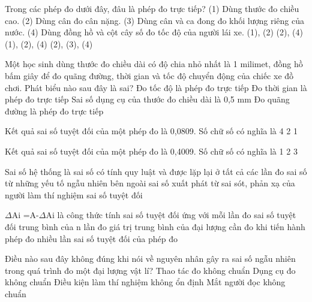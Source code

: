 \begin{ex} Trong các phép đo dưới đây, đâu là phép đo trực tiếp?
(1) Dùng thước đo chiều cao.
(2) Dùng cân đo cân nặng.
(3) Dùng cân và ca đong đo khối lượng riêng của nước.
(4) Dùng đồng hồ và cột cây số đo tốc độ của người lái xe.
\choice
{\True (1), (2)}
{(2), (4)}
{(1), (2), (4)}
{(2), (3), (4)}
\loigiai{}
\end{ex}

\begin{ex} Một học sinh dùng thước đo chiều dài có độ chia nhỏ nhất là 1 milimet, đồng
hồ bấm giây để đo quãng đường, thời gian và tốc độ chuyển động của chiếc xe đồ chơi.
Phát biểu nào sau đây là sai?
\choice
{\True Đo tốc độ là phép đo trực tiếp}
{Đo thời gian là phép đo trực tiếp}
{Sai số dụng cụ của thước đo chiều dài là 0,5 mm}
{Đo quãng đường là phép đo trực tiếp}
\loigiai{}
\end{ex}

\begin{ex} Kết quả sai số tuyệt đối của một phép đo là 0,0809. Số chữ số có nghĩa là
\choice
{4}
{2}
{1}
{}
\end{ex}

\begin{ex} Kết quả sai số tuyệt đối của một phép đo là 0,4009. Số chữ số có nghĩa là
\choice
{}
{1}
{2}
{3}
\end{ex}

\begin{ex} Sai số hệ thống là
\choice
{\True sai số có tính quy luật và được lặp lại ở tất cả các lần đo}
{sai số từ những yếu tố ngẫu nhiên bên ngoài}
{sai số xuất phát từ sai sót, phản xạ của người làm thí nghiệm}
{sai số tuyệt đối}
\loigiai{}
\end{ex}

\begin{ex} $\Delta$Ai =A-$\Delta$Ai là công thức tính
\choice
{\True sai số tuyệt đối ứng với mỗi lần đo}
{sai số tuyệt đối trung bình của n lần đo}
{giá trị trung bình của đại lượng cần đo khi tiến hành phép đo nhiều lần}
{sai số tuyệt đối của phép đo}
\loigiai{}
\end{ex}

\begin{ex} Điều nào sau đây không đúng khi nói về nguyên nhân gây ra sai số ngẫu
nhiên trong quá trình đo một đại lượng vật lí?
\choice
{Thao tác đo không chuẩn}
{\True Dụng cụ đo không chuẩn}
{Điều kiện làm thí nghiệm không ổn định}
{Mắt người đọc không chuẩn}
\loigiai{}
\end{ex}

